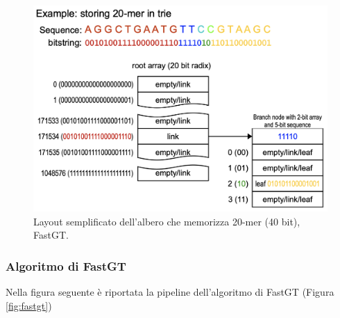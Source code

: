 \documentclass[../main.tex]{subfiles}
\begin{document}
\begin{figure}[h!]
	\centering
  	\captionsetup{justification=centering}
  	\includegraphics[scale=.35]{images/fastgt-art.png}
  	\caption{Layout semplificato dell'albero che memorizza 20-mer (40 bit), FastGT.}
  	\label{fig:art}
\end{figure}


\subsubsection{Algoritmo di FastGT}

Nella figura seguente è riportata la pipeline dell'algoritmo di FastGT (Figura \ref{fig:fastgt})
\end{document}
